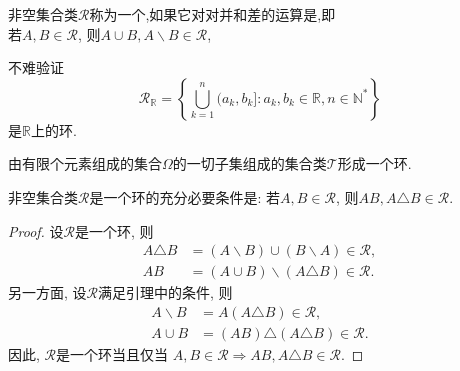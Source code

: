 \begin{definition}[环]
	非空集合类$\mathscr{R}$称为一个,如果它对对并和差的运算是,即\\
	若$A,B\in\mathscr{R}$, 则$A\cup B,A\backslash B\in\mathscr{R}$,
\end{definition}
\begin{example}
	不难验证\begin{equation}
	\mathscr{R}_\mathbb{R} = \left\{ \bigcup_{k=1}^n(a_k,b_k]:a_k,b_k\in\mathbb{R},n\in\mathbb{N}^*  \right\}
	\end{equation}
	是$\mathbb{R}$上的环.
\end{example}
\begin{example}
	由有限个元素组成的集合$\Omega$的一切子集组成的集合类$\mathscr{T}$形成一个环.
\end{example}
\begin{lemma}
	非空集合类$\mathscr{R}$是一个环的充分必要条件是:
	若$A,B\in\mathscr{R}$, 则$AB,A\triangle B\in\mathscr{R}$.
\end{lemma}
\begin{proof}
	设$\mathscr{R}$是一个环, 则\begin{align}
	A\triangle B &= (A\backslash B)\cup (B\backslash A)\in\mathscr{R},\nonumber\\
	AB &= (A\cup B)\backslash(A\triangle B)\in\mathscr{R}.
	\end{align}
	另一方面, 设$\mathscr{R}$满足引理中的条件, 则\begin{align}
	A\backslash B &= A(A\triangle B)\in\mathscr{R},\nonumber\\
	A\cup B &= (AB)\triangle(A\triangle B)\in\mathscr{R}.
	\end{align}
	因此, $\mathscr{R}$是一个环当且仅当 $A,B\in\mathscr{R}\Rightarrow AB,A\triangle B\in\mathscr{R}$.
\end{proof}

